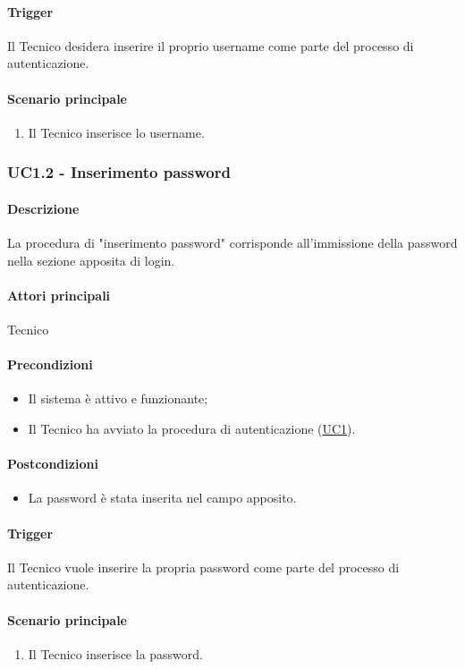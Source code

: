 \paragraph*{Trigger}
Il Tecnico desidera inserire il proprio username come parte del processo di autenticazione.

\paragraph*{Scenario principale}
\begin{enumerate}
  \item Il Tecnico inserisce lo username.
\end{enumerate}


\subsubsection{UC1.2 - Inserimento password}\label{UC1point2}
\paragraph*{Descrizione}
La procedura di "inserimento password" corrisponde all'immissione della password nella sezione apposita di login.

\paragraph*{Attori principali}
Tecnico

\paragraph*{Precondizioni}
\begin{itemize}
  \item Il sistema è attivo e funzionante;
  \item Il Tecnico ha avviato la procedura di autenticazione (\hyperref[UC1]{UC1}). 
\end{itemize}

\paragraph*{Postcondizioni}
\begin{itemize}
  \item La password è stata inserita nel campo apposito.
\end{itemize}

\paragraph*{Trigger}
Il Tecnico vuole inserire la propria password come parte del processo di autenticazione.

\paragraph*{Scenario principale}
\begin{enumerate}
  \item Il Tecnico inserisce la password.
\end{enumerate}